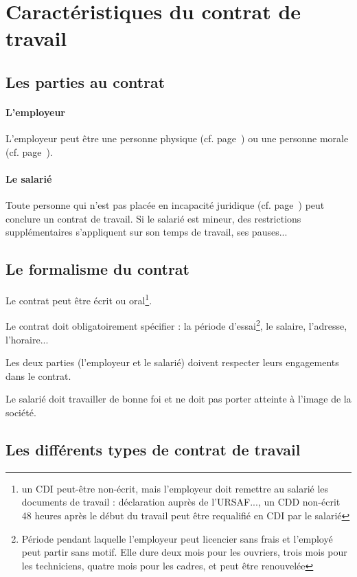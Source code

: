 \documentclass[10pt,a4paper]{article}
\begin{document}
\section{Caractéristiques du contrat de travail}

\subsection{Les parties au contrat}

\paragraph{L'employeur} L'employeur peut être une personne physique (cf. page~\pageref{personne-phys}) ou une personne morale (cf. page~\pageref{personne-mor}).

\paragraph{Le salarié} Toute personne qui n'est pas placée en incapacité juridique (cf. page~\pageref{vulnerable}) peut conclure un contrat de travail. Si le salarié est mineur, des restrictions supplémentaires s'appliquent sur son temps de travail, ses pauses...

\subsection{Le formalisme du contrat}

Le contrat peut être écrit ou oral\footnote{un CDI peut-être non-écrit, mais l'employeur doit remettre au salarié les documents de travail : déclaration auprès de l'URSAF..., un CDD non-écrit 48 heures après le début du travail peut être requalifié en CDI par le salarié}.

Le contrat doit obligatoirement spécifier : la période d'essai\footnote{Période pendant laquelle l'employeur peut licencier sans frais et l'employé peut partir sans motif. Elle dure deux mois pour les ouvriers, trois mois pour les techniciens, quatre mois pour les cadres, et peut être renouvelée}, le salaire, l'adresse, l'horaire...

Les deux parties (l'employeur et le salarié) doivent respecter leurs engagements dans le contrat.

Le salarié doit travailler de bonne foi et ne doit pas porter atteinte à l'image de la société.

\subsection{Les différents types de contrat de travail}
\end{document}
